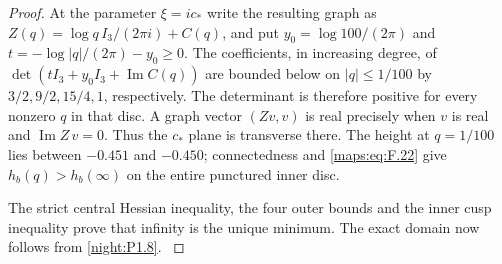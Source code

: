 \documentclass[11pt,a4paper]{article}
\numberwithin{equation}{section}
\theoremstyle{definition}
\begin{document}
\begin{proof}
At the parameter $\xi=ic_*$ write the resulting graph as
$Z(q)=\log q\,I_3/(2\pi i)+C(q)$, and put
$y_0=\log100/(2\pi)$ and $t=-\log|q|/(2\pi)-y_0\ge0$.
The coefficients, in increasing degree, of
$\det(tI_3+y_0I_3+\operatorname{Im}C(q))$ are bounded below
on $|q|\le1/100$ by
$3/2,9/2,15/4,1$, respectively.
The determinant is therefore positive for every nonzero $q$
in that disc. A graph vector $(Zv,v)$ is real precisely when
$v$ is real and $\operatorname{Im}Z\,v=0$. Thus the
$c_*$ plane is transverse there. The height at $q=1/100$
lies between $-0.451$ and $-0.450$; connectedness and
\eqref{maps:eq:F.22} give
$h_b(q)>h_b(\infty)$ on the entire punctured inner disc.

The strict central Hessian inequality, the four outer bounds and
the inner cusp inequality prove that infinity is the unique
minimum. The exact domain now follows from
\cref{night:P1.8}.
\hypertarget{tag-03L1}{}\label{layout:V:fresh-splitting}
\end{proof}
\end{document}
